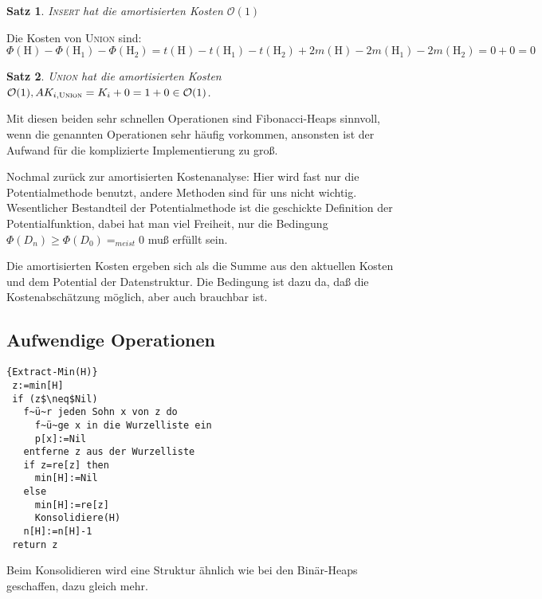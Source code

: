 \documentclass[ngerman,draft,parskip=half*,twoside]{scrreprt}
\theoremstyle{break}
\newtheorem{satz}{Satz}[chapter]
\theoremstyle{nonumberbreak}
\newcommand*{\OO}{\mathcal{O}}      %
\begin{document}
\begin{satz}
\textsc{Insert} hat die amortisierten Kosten $\OO(1)$
\end{satz}

Die Kosten von \textsc{Union} sind:
\[\Phi(\mbox{H})-\Phi(\mbox{H}_1)-\Phi(\mbox{H}_2)=t(\mbox{H})-t(\mbox{H}_1)-t(\mbox{H}_2)+2m(\mbox{H})-2m(\mbox{H}_1)-
2m(\mbox{H}_2)=0+0=0\]

\begin{satz}
\textsc{Union} hat die amortisierten Kosten $\OO(1), AK_{i,
  \text{\textsc{Union}}} =K_i +0=1+0\in\OO(1)$.
\end{satz}

Mit diesen beiden sehr schnellen Operationen sind Fibonacci-Heaps sinnvoll, wenn die genannten Operationen sehr häufig
vorkommen, ansonsten ist der Aufwand für die komplizierte Implementierung zu groß.

Nochmal zurück zur amortisierten Kostenanalyse:
Hier wird fast nur die Potentialmethode benutzt, andere Methoden sind für uns nicht wichtig. Wesentlicher Bestandteil
der Potentialmethode ist die geschickte Definition der Potentialfunktion, dabei hat man viel Freiheit, nur die Bedingung $\Phi
(D_n) \geq \Phi(D_0)=_{meist}0$ muß erfüllt sein.

Die amortisierten Kosten ergeben sich als die Summe aus den aktuellen Kosten und dem Potential der Datenstruktur. Die
Bedingung ist dazu da, daß die Kostenabschätzung möglich, aber auch brauchbar ist.

\subsection{Aufwendige Operationen}
\begin{Algorithmus}[H]
\begin{lstlisting}[frame=tlrb, mathescape=true, title=\textsc{Extract-Min\textnormal{(H)}}, gobble=1]{Extract-Min(H)}
 z:=min[H]
 if (z$\neq$Nil)
   f~ü~r jeden Sohn x von z do
     f~ü~ge x in die Wurzelliste ein
     p[x]:=Nil
   entferne z aus der Wurzelliste
   if z=re[z] then
     min[H]:=Nil
   else
     min[H]:=re[z]
     Konsolidiere(H)
   n[H]:=n[H]-1
 return z   
\end{lstlisting}
Beim Konsolidieren wird eine Struktur ähnlich wie bei den Binär-Heaps geschaffen, dazu gleich mehr.
\end{Algorithmus}
\end{document}
